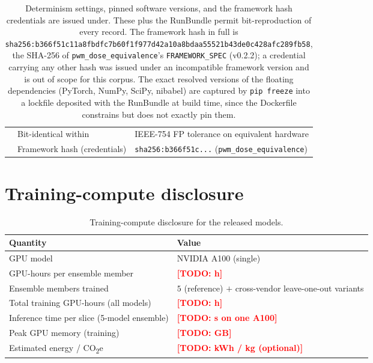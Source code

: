 \documentclass{article}
\newcommand{\todo}[1]{\textcolor{red}{\textbf{[TODO: #1]}}}
\begin{document}
\begin{table}[h]
\begin{tabular}{lll}
    & Bit-identical within     & IEEE-754 FP tolerance on equivalent hardware \\
    & Framework hash (credentials) & \texttt{sha256:b366f51c...} (\texttt{pwm\_dose\_equivalence}) \\
    \bottomrule
  \end{tabular}
  \caption{Determinism settings, pinned software versions, and the
  framework hash credentials are issued under. These plus the RunBundle
  permit bit-reproduction of every record. The framework hash in full is
  \texttt{sha256:b366f51c11a8fbdfc7b60f1f977d42a10a8bdaa55521b43de0c428afc289fb58},
  the SHA-256 of \texttt{pwm\_dose\_equivalence}'s \texttt{FRAMEWORK\_SPEC}
  (v0.2.2); a credential carrying any other hash was issued under an
  incompatible framework version and is out of scope for this corpus. The
  exact resolved versions of the floating dependencies (PyTorch, NumPy, SciPy,
  nibabel) are captured by \texttt{pip freeze} into a lockfile deposited with
  the RunBundle at build time, since the Dockerfile constrains but does not
  exactly pin them.}
  \label{tab:supp_repro}
\end{table}

\section{Training-compute disclosure}

\begin{table}[h]
  \centering
  \small
  \begin{tabular}{ll}
    \toprule
    \textbf{Quantity} & \textbf{Value} \\
    \midrule
    GPU model                                   & NVIDIA A100 (single) \\
    GPU-hours per ensemble member               & \todo{h} \\
    Ensemble members trained                    & $5$ (reference) $+$ cross-vendor leave-one-out variants \\
    Total training GPU-hours (all models)        & \todo{h} \\
    Inference time per slice (5-model ensemble)  & \todo{s on one A100} \\
    Peak GPU memory (training)                   & \todo{GB} \\
    Estimated energy / CO\textsubscript{2}e      & \todo{kWh / kg (optional)} \\
    \bottomrule
  \end{tabular}
  \caption{Training-compute disclosure for the released models.}
  \label{tab:supp_compute}
\end{table}
\end{document}
